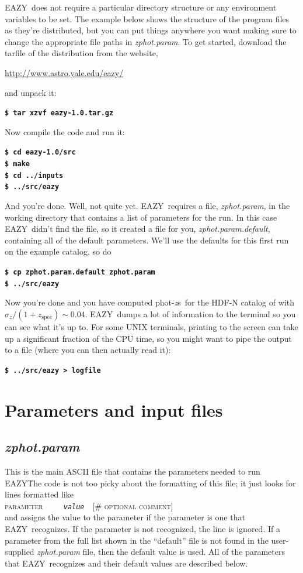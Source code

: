 \documentclass[11pt]{article}
\newcommand{\photozs}{\textrm{phot-}\textit{z}\textrm{s}}
\newcommand{\zspec}{z_\mathrm{spec}}
\newcommand{\eazy}{\textsc{EAZY}}
\newcommand{\textterm}[1]{\hspace*{1cm}\textbf{\texttt{\$ #1}}}
\begin{document}
\eazy\ does not require a particular directory structure or any environment
variables to be set.  The example below shows the structure of the program
files as they're distributed, but you can put things anywhere you want making
sure to change the appropriate file paths in \textit{zphot.param}.  To get
started, download the tarfile of the distribution from the website,
\begin{center}\url{http://www.astro.yale.edu/eazy/}\end{center}and
unpack it:

\textterm{tar xzvf eazy-1.0.tar.gz       }

Now compile the code and run it:

\textterm{cd eazy-1.0/src}\\
\textterm{make}\\
\textterm{cd ../inputs}\\
\textterm{../src/eazy}
        
And you're done.  Well, not quite yet.  \eazy\ requires a file,
\textit{zphot.param}, in the working directory that contains a list of
parameters for the run.  In this case \eazy\ didn't find the file, so it
created a file for you, \textit{zphot.param.default}, containing all of the
default parameters. We'll use the defaults for this first run on the example
catalog, so do

\textterm{cp zphot.param.default zphot.param}\\
\textterm{../src/eazy}
 
Now you're done and you have computed \photozs\ for the HDF-N catalog of
\cite{hdfn} with $\sigma_z/(1+\zspec) \sim 0.04$.  \eazy\ dumps a lot of
information to the terminal so you can see what it's up to.  For some UNIX
terminals, printing to the screen can take up a significant fraction of the CPU
time, so you might want to pipe the output to a file (where you can then
actually read it):

\textterm{../src/eazy > logfile}

\section{Parameters and input files \label{params}}

\subsection{\textit{zphot.param} \label{zphot.param}} This is the main ASCII file
that contains the parameters needed to run \eazy\.  The code is not too picky
about the formatting of this file; it just looks for lines formatted like \\
\hspace*{1cm}\textsc{parameter}\ \ \ \ \ \textit{\texttt{value}}\ \ [\# \textsc{optional comment}]\\ and assigns
the value to the parameter if the parameter is one that \eazy\ recognizes.  If the
parameter is not recognized, the line is ignored.  If a parameter from the full
list shown in the ``default'' file is not found in the user-supplied
\textit{zphot.param} file, then the default value is used.  All of the parameters
that \eazy\ recognizes and their default values are described below.
\end{document}
